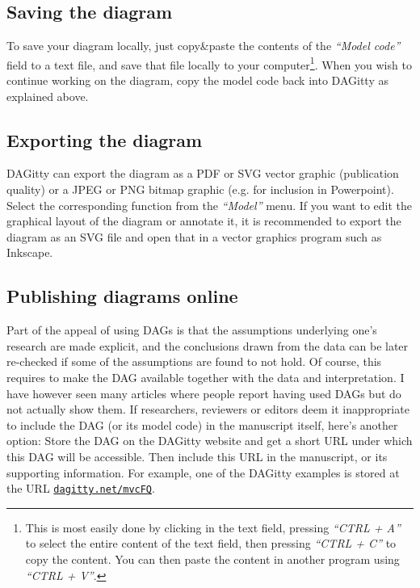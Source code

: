 \documentclass[a4paper]{article} %
\newcommand{\pp}{{\sc DAG}itty\xspace}
\newcommand{\action}[1]{\emph{``#1''}}
\begin{document}
\subsection{Saving the diagram} 

To save your diagram locally, just copy\&paste the contents of the \action{Model code}
field to a text file, 
and save that file locally to your computer\footnote{This is most easily done
by clicking in the text field, pressing \action{CTRL + A} to select the entire content
of the text field, then pressing \action{CTRL + C} to copy the content. You
can then paste the content in another program using \action{CTRL + V}.}.
When you wish to continue working on the
diagram, copy the model code back into \pp as explained above. 

\subsection{Exporting the diagram}

\pp can export the diagram as a PDF or SVG vector graphic (publication quality)
or a JPEG or PNG bitmap graphic (e.g. for inclusion in Powerpoint). Select the
corresponding function from the \action{Model} menu. If you want to edit the graphical
layout of the diagram or annotate it, it is recommended to export the diagram as an
SVG file and open that in a vector graphics program such as Inkscape.

\subsection{Publishing diagrams online}

Part of the appeal of using DAGs is that the assumptions underlying
one's research are made explicit, and the conclusions drawn from 
the data can be later re-checked if some of the assumptions are found
to not hold. Of course, this requires to make the DAG available together
with the data and interpretation. I have however seen many articles
where people report having used DAGs but do not actually show them.
If researchers, reviewers or editors deem it inappropriate to include the 
DAG (or its model code) in the manuscript itself, here's another option:
Store the DAG on the \pp website and get a short URL under which
this DAG will be accessible. Then include this URL in the manuscript,
or its supporting information. For example, one of the \pp examples
is stored at the URL \href{http://dagitty.net/mvcFQ}{\tt dagitty.net/mvcFQ}.
\end{document}
